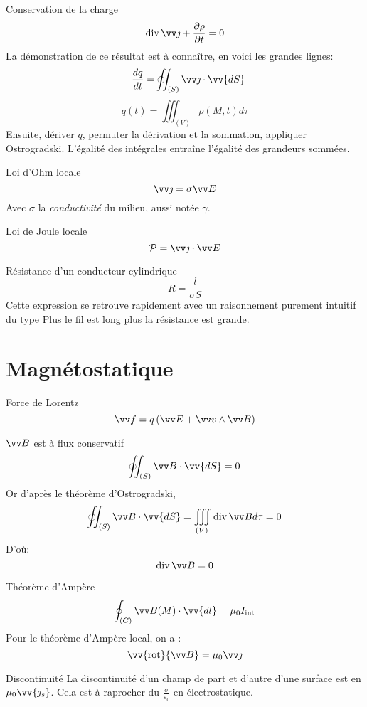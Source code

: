 \documentclass[french, a4paper, 11pt, twocolumn]{article}
\newcommand{\po}{\left(}         %
\newcommand{\pf}{\right)}        %
\newcommand{\pof}[1]{\po #1 \pf} %
\DeclareMathOperator{\diverg}{div}        %
\newcommand{\rota}{\vv{\mathrm{rot}}}    %
\newcommand{\ooint}{\ocircle\hspace{-3.65mm}\int\hspace{-2mm}\int}
\begin{document}
\begin{cadre}{Conservation de la charge}
  \[\diverg \vv\jmath + \dfrac{\partial\rho}{\partial t} = 0\]
  La démonstration de ce résultat est à connaître, en voici les grandes lignes:
  \[-\dfrac{dq}{dt} = \ooint_{(S)}\vv \jmath \cdot\vv{dS}\]
  \[q(t) = \iiint_{(V)} \rho(M, t)d\tau\]
  Ensuite, dériver \(q\), permuter la dérivation et la sommation, appliquer Ostrogradski. L'égalité des intégrales entraîne l'égalité des grandeurs sommées.
\end{cadre}

\begin{cadre}{Loi d'Ohm locale}
  \[\vv \jmath = \sigma\vv E\]
  Avec \(\sigma\) la \emph{conductivité} du milieu, aussi notée \(\gamma\).
\end{cadre}

\begin{cadre}{Loi de Joule locale}
  \[\mathcal P = \vv\jmath\cdot\vv E\]
\end{cadre}

\begin{cadre}{Résistance d'un conducteur cylindrique}
  \[R = \dfrac{l}{\sigma S}\]
  Cette expression se retrouve rapidement avec un raisonnement purement intuitif du type \og Plus le fil est long plus la résistance est grande\fg{}.
\end{cadre}

\section{Magnétostatique}
\begin{cadre}{Force de Lorentz}
  \[ \vv f = q\pof{\vv E + \vv v \wedge \vv B}\]
\end{cadre}

\begin{cadre}{\(\vv B\) est à flux conservatif}
  \[\ooint_{(S)}\vv B \cdot\vv{dS} = 0\]
  Or d'après le théorème d'Ostrogradski,
  \[\ooint_{(S)}\vv B \cdot\vv{dS} = \iiint_{(V)}\diverg \vv B d\tau = 0\]
  D'où:
  \[\diverg \vv B = 0\]
\end{cadre}

\begin{cadre}{Théorème d'Ampère}
  \[\oint_{(C)} \vv B(M)\cdot \vv{dl} = \mu_{0}I_{\text{int}}\]
  Pour le théorème d'Ampère local, on a :
  \[\rota{\vv B}=\mu_{0} \vv \jmath\]
\end{cadre}

\begin{cadre}{Discontinuité}
  La discontinuité d'un champ de part et d'autre d'une surface est en \(\mu_{0}\vv{\jmath_{s}}\). Cela est à raprocher du \(\frac{\sigma}{\varepsilon_{0}}\) en électrostatique.
\end{cadre}
\end{document}
